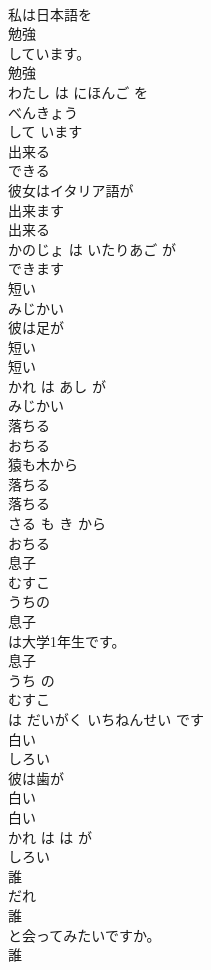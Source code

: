 \documentclass[8pt]{extreport}
\begin{document}
\begin{CJK}{UTF8}{min}
\\	私は日本語を
\\	勉強
\\	しています。	
\\	勉強 
\\	わたし は にほんご を 
\\	べんきょう
\\	して います	
\\	出来る	
\\	できる	
\\	彼女はイタリア語が
\\	出来ます
\\	出来る 
\\	かのじょ は いたりあご が 
\\	できます
\\	短い	
\\	みじかい	
\\	彼は足が
\\	短い
\\	短い 
\\	かれ は あし が 
\\	みじかい
\\	落ちる	
\\	おちる	
\\	猿も木から
\\	落ちる
\\	落ちる 
\\	さる も き から 
\\	おちる
\\	息子	
\\	むすこ	
\\	うちの
\\	息子
\\	は大学1年生です。	
\\	息子 
\\	うち の 
\\	むすこ
\\	は だいがく いちねんせい です	
\\	白い	
\\	しろい	
\\	彼は歯が
\\	白い
\\	白い 
\\	かれ は は が 
\\	しろい
\\	誰	
\\	だれ	
\\	誰
\\	と会ってみたいですか。	
\\	誰 

\end{CJK}
\end{document}
